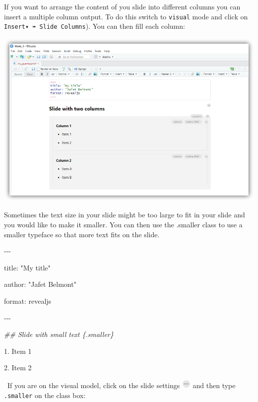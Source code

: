 \documentclass[
  letterpaper,
  DIV=11,
  numbers=noendperiod]{scrartcl}
\newenvironment{Shaded}{\begin{snugshade}}{\end{snugshade}}
\newcommand{\DecValTok}[1]{\textcolor[rgb]{0.68,0.00,0.00}{#1}}
\newcommand{\DocumentationTok}[1]{\textcolor[rgb]{0.37,0.37,0.37}{\textit{#1}}}
\newcommand{\FloatTok}[1]{\textcolor[rgb]{0.68,0.00,0.00}{#1}}
\newcommand{\NormalTok}[1]{\textcolor[rgb]{0.00,0.23,0.31}{#1}}
\newcommand{\SpecialCharTok}[1]{\textcolor[rgb]{0.37,0.37,0.37}{#1}}
\newcommand{\StringTok}[1]{\textcolor[rgb]{0.13,0.47,0.30}{#1}}
\begin{document}
If you want to arrange the content of you slide into different columns
you can insert a multiple column output. To do this switch to
\texttt{visual} mode and click on \texttt{Insert▾\ ➠\ Slide\ Columns}).
You can then fill each column:

\begin{center}
\includegraphics{images/quarto12.png}
\end{center}

Sometimes the text size in your slide might be too large to fit in your
slide and you would like to make it smaller. You can then use the
.smaller class to use a smaller typeface so that more text fits on the
slide.

\begin{Shaded}
\begin{Highlighting}[]

\SpecialCharTok{{-}{-}{-}}

\NormalTok{title}\SpecialCharTok{:} \StringTok{"My title"}

\NormalTok{author}\SpecialCharTok{:} \StringTok{"Jafet Belmont"}

\NormalTok{format}\SpecialCharTok{:}\NormalTok{ revealjs}

\SpecialCharTok{{-}{-}{-}}

\DocumentationTok{\#\# Slide with small text \{.smaller\}}

\FloatTok{1.}\NormalTok{  Item }\DecValTok{1}

\FloatTok{2.}\NormalTok{  Item }\DecValTok{2}

 
\end{Highlighting}
\end{Shaded}

~If you are on the visual model, click on the slide settings
\includegraphics[width=0.17708in,height=\textheight]{images/threedots.png}
and then type \texttt{.smaller} on the class box:
\end{document}
